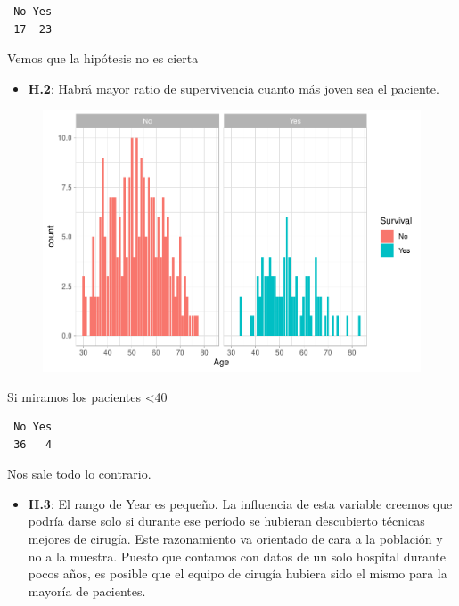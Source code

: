 \begin{verbatim}
 No Yes 
 17  23 
\end{verbatim}

Vemos que la hipótesis no es cierta

\begin{itemize}
    \item \textbf{H.2}: Habrá mayor ratio de supervivencia cuanto más joven sea el paciente.
\end{itemize}

\begin{figure}[H]\includegraphics[width=.9\linewidth]{img/EDA2_files/figure-latex/unnamed-chunk-33-1} \end{figure}

Si miramos los pacientes \textless40

\begin{verbatim}
 No Yes 
 36   4 
\end{verbatim}

Nos sale todo lo contrario.

\begin{itemize}
    \item \textbf{H.3}: El rango de Year es pequeño. La influencia de esta variable creemos que podría darse solo si durante ese período se hubieran descubierto técnicas mejores de cirugía. Este razonamiento va orientado de cara a la población y no a la muestra. Puesto que contamos con datos de un solo hospital durante pocos años, es posible que el equipo de cirugía hubiera sido el mismo para la mayoría de pacientes.
\end{itemize}

